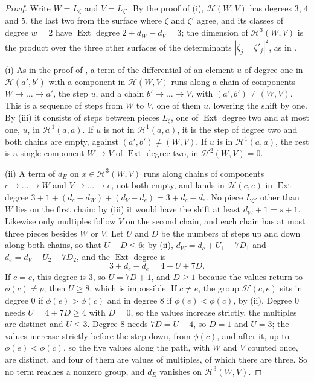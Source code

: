 \documentclass[11pt,reqno]{amsart}
\theoremstyle{plain}
\theoremstyle{definition}
\theoremstyle{remark}
\newcommand{\cH}{\mathcal{H}}
\DeclareMathOperator{\Ext}{Ext}
\begin{document}
\begin{proof}
Write $W=L_{\zeta}$ and $V=L_{\zeta'}$. By the proof of
(i), $\cH(W,V)$ has degrees $3$, $4$ and $5$, the last
two from the surface where $\zeta$ and $\zeta'$ agree, and its classes of
degree $w=2$ have $\Ext$ degree $2+d_{W}-d_{V}=3$; the dimension of
$\cH^{3}(W,V)$ is the product over the three other surfaces of the
determinants $|\zeta_{j}-\zeta'_{j}|^{2}$, as in .

(i) As in the proof of , a term of the differential of an
element $u$ of degree one in $\cH(a',b')$ with a component in $\cH(W,V)$
runs along a chain of components $W\to\dots\to a'$, the step $u$, and a chain
$b'\to\dots\to V$, with $(a',b')\ne(W,V)$. This is a sequence of steps from
$W$ to $V$, one of them $u$, lowering the shift by one. By
(iii) it consists of steps between pieces $L_{\zeta}$,
one of $\Ext$ degree two and at most one, $u$, in $\cH^{1}(a,a)$. If $u$ is
not in $\cH^{1}(a,a)$, it is the step of degree two and both chains are
empty, against $(a',b')\ne(W,V)$. If $u$ is in $\cH^{1}(a,a)$, the rest is a
single component $W\to V$ of $\Ext$ degree two, in $\cH^{2}(W,V)=0$.

(ii) A term of $d_{E}$ on $x\in\cH^{3}(W,V)$ runs along chains of components
$c\to\dots\to W$ and $V\to\dots\to e$, not both empty, and lands in $\cH(c,e)$
in $\Ext$ degree $3+1+(d_{c}-d_{W})+(d_{V}-d_{e})=3+d_{c}-d_{e}$. No piece
$L_{\zeta''}$ other than $W$ lies on the first chain: by
(iii) it would have the shift at least $d_{W}+1=s+1$.
Likewise only multiples follow $V$ on the second chain, and each chain has at
most three pieces besides $W$ or $V$. Let $U$ and $D$ be the numbers of steps
up and down along both chains, so that $U+D\le6$; by
(ii), $d_{W}=d_{c}+U_{1}-7D_{1}$ and
$d_{e}=d_{V}+U_{2}-7D_{2}$, and the $\Ext$ degree is
\[
  3+d_{c}-d_{e}=4-U+7D .
\]
If $c=e$, this degree is $3$, so $U=7D+1$, and $D\ge1$ because the values
return to $\phi(c)\ne p$; then $U\ge8$, which is impossible. If $c\ne e$, the
group $\cH(c,e)$ sits in degree $0$ if $\phi(e)>\phi(c)$ and in degree $8$ if
$\phi(e)<\phi(c)$, by (ii). Degree $0$ needs
$U=4+7D\ge4$ with $D=0$, so the values increase strictly, the multiples are
distinct and $U\le3$. Degree $8$ needs $7D=U+4$, so $D=1$ and $U=3$; the
values increase strictly before the step down, from $\phi(c)$, and after it,
up to $\phi(e)<\phi(c)$, so the five values along the path, with $W$ and $V$
counted once, are distinct, and four of them are values of multiples, of
which there are three. So no term reaches a nonzero group, and $d_{E}$
vanishes on $\cH^{3}(W,V)$.


\end{proof}
\end{document}
